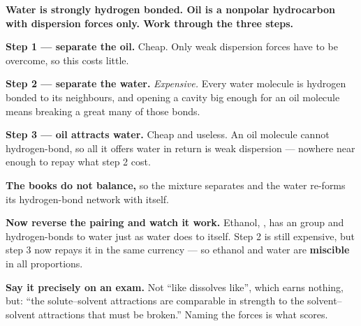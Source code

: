 \documentclass{apchem-worksheet}
\begin{document}
\begin{center}
\end{center}

\begin{workedexample}
\textbf{Water is strongly hydrogen bonded. Oil is a nonpolar
hydrocarbon with dispersion forces only. Work through the three steps.}

\textbf{Step 1 --- separate the oil.} Cheap. Only weak dispersion forces
have to be overcome, so this costs little.

\textbf{Step 2 --- separate the water.} \emph{Expensive.} Every water
molecule is hydrogen bonded to its neighbours, and opening a cavity big
enough for an oil molecule means breaking a great many of those bonds.

\textbf{Step 3 --- oil attracts water.} Cheap and useless. An oil
molecule cannot hydrogen-bond, so all it offers water in return is weak
dispersion --- nowhere near enough to repay what step 2 cost.

\textbf{The books do not balance,} so the mixture separates and the
water re-forms its hydrogen-bond network with itself.

\textbf{Now reverse the pairing and watch it work.} Ethanol,
, has an  group and hydrogen-bonds to water just
as water does to itself. Step 2 is still expensive, but step 3 now
repays it in the same currency --- so ethanol and water are
\textbf{miscible} in all proportions.

\textbf{Say it precisely on an exam.} Not ``like dissolves like'', which
earns nothing, but: ``the solute--solvent attractions are comparable in
strength to the solvent--solvent attractions that must be broken.''
Naming the forces is what scores.
\end{workedexample}
\end{document}
